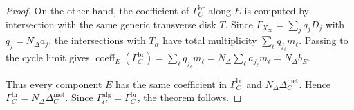 \documentclass[10pt,a4paper]{amsart}
\begin{document}
\begin{proof}
On the other hand, the coefficient of $\Gamma_C^{\mathrm{br}}$ along $E$ is
computed by intersection with the same generic transverse disk $T$. Since
$\Gamma_{X_\infty}=\sum_j q_jD_j$ with $q_j=N_\Delta a_j$, the intersections
with $T_\alpha$ have total multiplicity
$\sum_\ell q_{j_\ell}m_\ell$. Passing to the cycle limit gives
$\operatorname{coeff}_E(\Gamma_C^{\mathrm{br}})
=\sum_\ell q_{j_\ell}m_\ell
=N_\Delta\sum_\ell a_{j_\ell}m_\ell
=N_\Delta b_E$.

Thus every component $E$ has the same coefficient in
$\Gamma_C^{\mathrm{br}}$ and $N_\Delta\Delta_C^{\mathrm{met}}$. Hence
$\Gamma_C^{\mathrm{br}}=N_\Delta\Delta_C^{\mathrm{met}}$. Since
$\Gamma_C^{\mathrm{alg}}=\Gamma_C^{\mathrm{br}}$, the theorem follows.
\end{proof}
\end{document}
